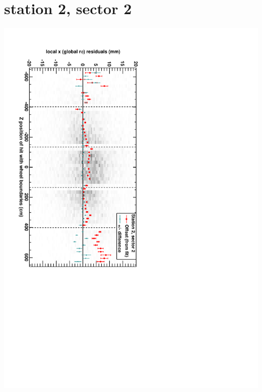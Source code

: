 \documentclass[compress]{beamer}
\begin{document}
\section*{station 2, sector 2}
\begin{frame} \vfill \mbox{\hspace{-1 cm}\includegraphics[height=1.2\linewidth, angle=90]{DTrphiVsZ_st2_sr02.pdf}} \end{frame}
\end{document}
